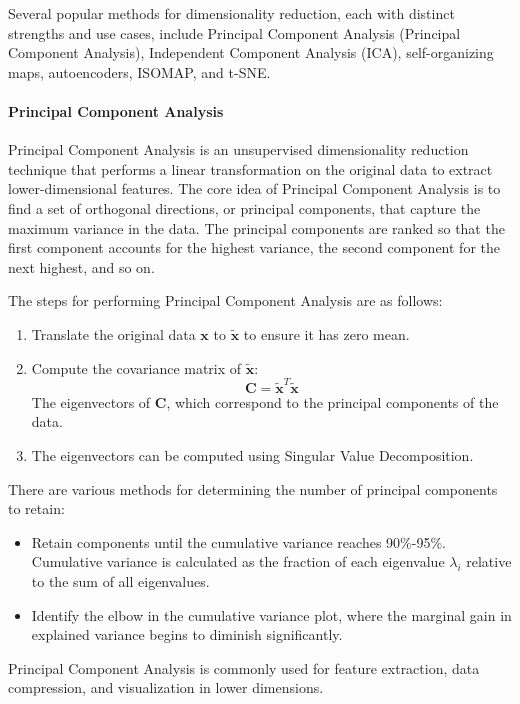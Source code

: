 Several popular methods for dimensionality reduction, each with distinct strengths and use cases, include Principal Component Analysis (Principal Component Analysis), Independent Component Analysis (ICA), self-organizing maps, autoencoders, ISOMAP, and t-SNE.

\paragraph*{Principal Component Analysis}
Principal Component Analysis is an unsupervised dimensionality reduction technique that performs a linear transformation on the original data to extract lower-dimensional features.
The core idea of Principal Component Analysis is to find a set of orthogonal directions, or principal components, that capture the maximum variance in the data. 
The principal components are ranked so that the first component accounts for the highest variance, the second component for the next highest, and so on.

The steps for performing Principal Component Analysis are as follows:
\begin{enumerate}
    \item Translate the original data $\mathbf{x}$ to $\tilde{\mathbf{x}}$ to ensure it has zero mean.
    \item Compute the covariance matrix of $\tilde{\mathbf{x}}$: 
        \[\mathbf{C}=\tilde{\mathbf{x}}^T\tilde{\mathbf{x}}\]
        The eigenvectors of $\mathbf{C}$, which correspond to the principal components of the data.
    \item The eigenvectors can be computed using Singular Value Decomposition. 
\end{enumerate}
There are various methods for determining the number of principal components to retain:
\begin{itemize} 
    \item Retain components until the cumulative variance reaches 90\%-95\%. 
        Cumulative variance is calculated as the fraction of each eigenvalue $\lambda_i$ relative to the sum of all eigenvalues. 
    \item Identify the elbow in the cumulative variance plot, where the marginal gain in explained variance begins to diminish significantly. 
\end{itemize}
Principal Component Analysis is commonly used for feature extraction, data compression, and visualization in lower dimensions.

